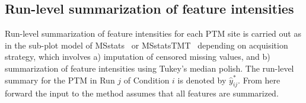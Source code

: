 \documentclass{mcp}
\begin{document}


\subsection{Run-level summarization of feature intensities}
\label{sec:sum}

Run-level summarization of feature intensities for each PTM site is carried out as in the sub-plot model of MSstats~\cite{choi_etal_14a} or MSstatsTMT~\cite{Huang:2020} depending on acquisition strategy, which involves a) imputation of censored missing values, and b) summarization of feature intensities using Tukey's median polish. \cite{tukey_77a} The run-level summary for the PTM in Run $j$ of Condition $i$ is denoted by $\hat{y}_{ij}^{\ast}$. From here forward the input to the method assumes that all features are summarized.
\end{document}

